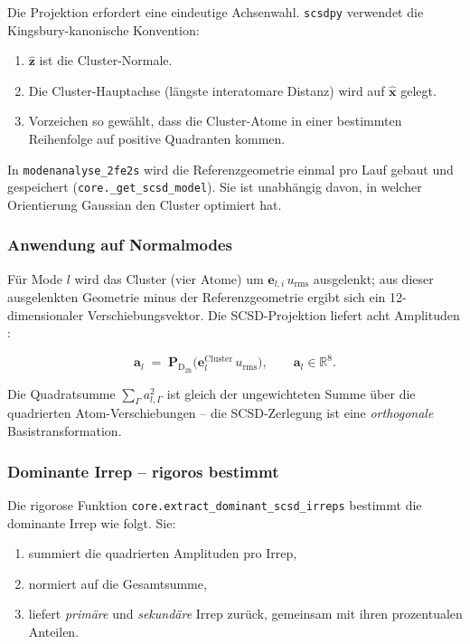 \documentclass[11pt,a4paper,twoside]{article}
\newcommand{\evec}{\mathbf{e}}
\newcommand{\xhat}{\hat{\mathbf{x}}}
\newcommand{\zhat}{\hat{\mathbf{z}}}
\newcommand{\urms}{u_{\mathrm{rms}}}
\theoremstyle{remark}
\begin{document}
Die Projektion erfordert eine eindeutige Achsenwahl. \texttt{scsdpy}
verwendet die Kingsbury-kanonische Konvention:

\begin{enumerate}
  \item $\zhat$ ist die Cluster-Normale.
  \item Die Cluster-Hauptachse (l\"angste interatomare Distanz) wird
        auf $\xhat$ gelegt.
  \item Vorzeichen so gew\"ahlt, dass die Cluster-Atome in einer
        bestimmten Reihenfolge auf positive Quadranten kommen.
\end{enumerate}

In \texttt{modenanalyse\_2fe2s} wird die Referenzgeometrie einmal pro
Lauf gebaut und gespeichert (\texttt{core.\_get\_scsd\_model}). Sie ist
unabh\"angig davon, in welcher Orientierung Gaussian den Cluster
optimiert hat.

\subsubsection*{Anwendung auf Normalmodes}

F\"ur Mode $l$ wird das Cluster (vier Atome) um $\evec_{l,i}\,\urms$
ausgelenkt; aus dieser ausgelenkten Geometrie minus der
Referenzgeometrie ergibt sich ein 12-dimensionaler Verschiebungsvektor.
Die SCSD-Projektion liefert acht Amplituden \cite{Kingsbury2024}:

\begin{equation}
  \mathbf{a}_l \;=\;
  \mathbf{P}_{\mathrm{D}_{2\mathrm{h}}}\bigl(\evec_l^{\text{Cluster}} \,\urms\bigr) ,
  \qquad
  \mathbf{a}_l \in \mathbb{R}^8 .
  \label{eq:scsd-projection}
\end{equation}

Die Quadratsumme $\sum_\Gamma a_{l,\Gamma}^2$ ist gleich der
ungewichteten Summe \"uber die quadrierten Atom-Verschiebungen --
die SCSD-Zerlegung ist eine \emph{orthogonale} Basistransformation.

\subsubsection*{Dominante Irrep -- rigoros bestimmt}
\label{sec:scsd-rigoros}

Die rigorose Funktion \texttt{core.extract\_dominant\_scsd\_irreps}
bestimmt die dominante Irrep wie folgt. Sie:

\begin{enumerate}
  \item summiert die quadrierten Amplituden pro Irrep,
  \item normiert auf die Gesamtsumme,
  \item liefert \emph{prim\"are} und \emph{sekund\"are} Irrep zur\"uck,
        gemeinsam mit ihren prozentualen Anteilen.
\end{enumerate}
\end{document}
